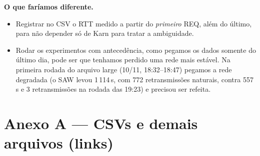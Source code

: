 \documentclass[11pt,a4paper]{article}
\begin{document}
\textbf{O que faríamos diferente.}
\begin{itemize}
  \item Registrar no CSV o RTT medido a partir do \emph{primeiro} REQ, além do último, para não
        depender só de Karn para tratar a ambiguidade.
  \item Rodar os experimentos com antecedência, como pegamos os dados somente do último dia, 
        pode ser que tenhamos perdido uma rede mais estável. Na primeira rodada do
        arquivo large (10/11, 18:32--18:47) pegamos a rede degradada (o SAW levou 1\,114\,s, com
        772 retransmissões naturais, contra 557\,s e 3 retransmissões na rodada das 19:23)
        e precisou ser refeita.\end{itemize}

\appendix
\section*{Anexo A --- CSVs e demais arquivos (links)}
\end{document}
